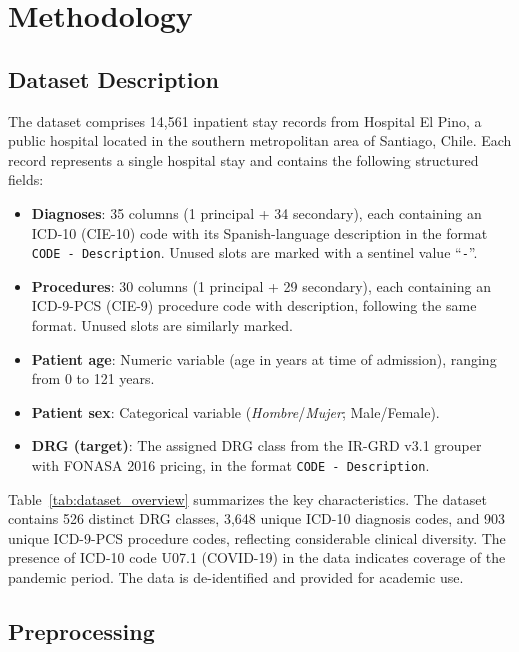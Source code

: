 \section{Methodology}

\subsection{Dataset Description}

The dataset comprises 14,561 inpatient stay records from Hospital El Pino, a public hospital located in the southern metropolitan area of Santiago, Chile. Each record represents a single hospital stay and contains the following structured fields:

\begin{itemize}
    \item \textbf{Diagnoses}: 35 columns (1 principal + 34 secondary), each containing an ICD-10 (CIE-10) code with its Spanish-language description in the format \texttt{CODE - Description}. Unused slots are marked with a sentinel value ``\texttt{-}''.
    \item \textbf{Procedures}: 30 columns (1 principal + 29 secondary), each containing an ICD-9-PCS (CIE-9) procedure code with description, following the same format. Unused slots are similarly marked.
    \item \textbf{Patient age}: Numeric variable (age in years at time of admission), ranging from 0 to 121 years.
    \item \textbf{Patient sex}: Categorical variable (\textit{Hombre}/\textit{Mujer}; Male/Female).
    \item \textbf{DRG (target)}: The assigned DRG class from the IR-GRD v3.1 grouper with FONASA 2016 pricing, in the format \texttt{CODE - Description}.
\end{itemize}

Table~\ref{tab:dataset_overview} summarizes the key characteristics. The dataset contains 526 distinct DRG classes, 3,648 unique ICD-10 diagnosis codes, and 903 unique ICD-9-PCS procedure codes, reflecting considerable clinical diversity. The presence of ICD-10 code U07.1 (COVID-19) in the data indicates coverage of the pandemic period. The data is de-identified and provided for academic use.



\subsection{Preprocessing}

